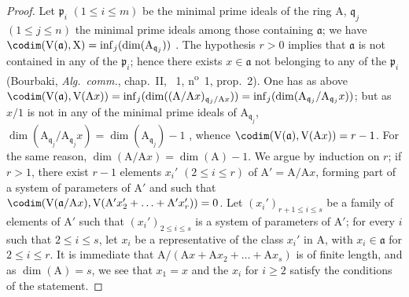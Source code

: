 \begin{proof}
Let $\mathfrak{p}_i$ $(1\leq i\leq m)$ be the minimal prime ideals of the ring $\mathrm{A}$, $\mathfrak{q}_j$ $(1\leq j\leq n)$ the minimal prime ideals among those containing $\mathfrak{a}$; we have  $\codim(\mathrm{V}(\mathfrak{a}),\mathrm{X})=\inf_j(\dim(\mathrm{A}_{\mathfrak{q}_j}))$ .
The hypothesis $r>0$ implies that $\mathfrak{a}$ is not contained in any of the $\mathfrak{p}_i$; hence there exists $x\in\mathfrak{a}$ not belonging to any of the $\mathfrak{p}_i$ (Bourbaki, \emph{Alg.~comm.}, chap.~II, \textsection~1, n\textsuperscript{o}~1, prop.~2).
One has as above $\codim(\mathrm{V}(\mathfrak{a}),\mathrm{V}(\mathrm{A}x))=\inf_j(\dim((\mathrm{A}/\mathrm{A}x)_{\mathfrak{q}_j/\mathrm{A}x}))=\inf_j(\dim(\mathrm{A}_{\mathfrak{q}_j}/\mathrm{A}_{\mathfrak{q}_j}x))$; but as $x/1$ is not in any of the minimal prime ideals of $\mathrm{A}_{\mathfrak{q}_j}$, $\dim(\mathrm{A}_{\mathfrak{q}_j}/\mathrm{A}_{\mathfrak{q}_j}x)=\dim(\mathrm{A}_{\mathfrak{q}_j})-1$ , whence $\codim(\mathrm{V}(\mathfrak{a}),\mathrm{V}(\mathrm{A}x))=r-1$.
For the same reason, $\dim(\mathrm{A}/\mathrm{A}x)=\dim(\mathrm{A})-1$.
We argue by induction on $r$; if $r>1$, there exist $r-1$ elements $x_i'$ $(2\leq i\leq r)$ of $\mathrm{A}'=\mathrm{A}/\mathrm{A}x$, forming part of a system of parameters of $\mathrm{A}'$ and such that $\codim(\mathrm{V}(\mathfrak{a}/\mathrm{A}x),\mathrm{V}(\mathrm{A}'x_2'+\ldots+\mathrm{A}'x_r'))=0$.
Let $(x_i')_{r+1\leq i\leq s}$ be a family of elements of $\mathrm{A}'$ such that $(x_i')_{2\leq i\leq s}$ is a system of parameters of $\mathrm{A}'$; for every $i$ such that $2\leq i\leq s$, let $x_i$ be a representative of the class $x_i'$ in $\mathrm{A}$, with $x_i\in\mathfrak{a}$ for $2\leq i\leq r$. It is immediate that $\mathrm{A}/(\mathrm{A}x+\mathrm{A}x_2+\ldots+\mathrm{A}x_s)$ is of finite length, and as $\dim(\mathrm{A})=s$, we see that $x_1=x$ and the $x_i$ for $i\geq 2$ satisfy the conditions of the statement.
\end{proof}

